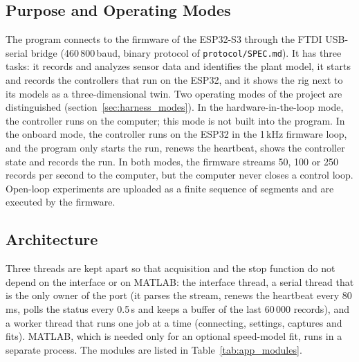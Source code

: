 \documentclass[a4paper,11pt]{article}
\begin{document}
\subsection{Purpose and Operating Modes}
\label{sec:app_purpose}
The program connects to the firmware of the ESP32-S3 through the FTDI USB-serial bridge (460\,800\,baud, binary protocol of \nolinkurl{protocol/SPEC.md}). It has three tasks: it records and analyzes sensor data and identifies the plant model, it starts and records the controllers that run on the ESP32, and it shows the rig next to its models as a three-dimensional twin. Two operating modes of the project are distinguished (section~\ref{sec:harness_modes}). In the hardware-in-the-loop mode, the controller runs on the computer; this mode is not built into the program. In the onboard mode, the controller runs on the ESP32 in the 1\,kHz firmware loop, and the program only starts the run, renews the heartbeat, shows the controller state and records the run. In both modes, the firmware streams 50, 100 or 250 records per second to the computer, but the computer never closes a control loop. Open-loop experiments are uploaded as a finite sequence of segments and are executed by the firmware.

\subsection{Architecture}
\label{sec:app_architecture}
Three threads are kept apart so that acquisition and the stop function do not depend on the interface or on MATLAB: the interface thread, a serial thread that is the only owner of the port (it parses the stream, renews the heartbeat every 80\,ms, polls the status every 0.5\,s and keeps a buffer of the last 60\,000 records), and a worker thread that runs one job at a time (connecting, settings, captures and fits). MATLAB, which is needed only for an optional speed-model fit, runs in a separate process. The modules are listed in Table~\ref{tab:app_modules}.
\end{document}
